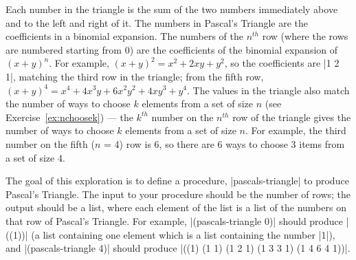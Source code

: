 \begin{schemeregion}
{Each number in the triangle is the sum of the two numbers immediately above and to the left and right of it.  The numbers in Pascal's Triangle are the coefficients in a binomial expansion.  The numbers of the $n^{th}$ row (where the rows are numbered starting from 0) are the coefficients of the binomial expansion of $(x+y)^n$.  For example, $(x+y)^2 = x^2+2xy+y^2$, so the coefficients are \scheme|1 2 1|, matching the third row in the triangle; from the fifth row, $(x+y)^4 = x^4 + 4x^3y + 6 x^2y^2 + 4xy^3 + y^4$.  The values in the triangle also match the number of ways to choose $k$ elements from a set of size $n$ (see Exercise~\ref{ex:nchoosek}) --- the $k^{th}$ number on the $n^{th}$ row of the triangle gives the number of ways to choose $k$ elements from a set of size $n$.  For example, the third number on the fifth ($n$ = 4) row is 6, so there are 6 ways to choose 3 items from a set of size 4.


The goal of this exploration is to define a procedure, \scheme|pascals-triangle| to produce Pascal's Triangle.  The input to your procedure should be the number of rows; the output should be a list, where each element of the list is a list of the numbers on that row of Pascal's Triangle.  For example, \scheme|(pascals-triangle 0)| should produce \schemeresult|((1))| (a list containing one element which is a list containing the number \schemeresult|1|), and \scheme|(pascals-triangle 4)| should produce \schemeresult|((1) (1 1) (1 2 1) (1 3 3 1) (1 4 6 4 1))|.

}
\end{schemeregion}
